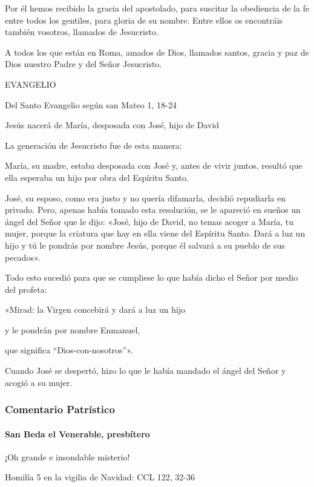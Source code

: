 \documentclass[]{article}
\let\oldparagraph\paragraph
\renewcommand{\paragraph}[1]{\oldparagraph{#1}\mbox{}}
\begin{document}
Por él hemos recibido la gracia del apostolado, para suscitar la
obediencia de la fe entre todos los gentiles, para gloria de su nombre.
Entre ellos os encontráis también vosotros, llamados de Jesucristo.

A todos los que están en Roma, amados de Dios, llamados santos, gracia y
paz de Dios nuestro Padre y del Señor Jesucristo.

EVANGELIO

Del Santo Evangelio según san Mateo 1, 18-24

Jesús nacerá de María, desposada con José, hijo de David

La generación de Jesucristo fue de esta manera:

María, su madre, estaba desposada con José y, antes de vivir juntos,
resultó que ella esperaba un hijo por obra del Espíritu Santo.

José, su esposo, como era justo y no quería difamarla, decidió
repudiarla en privado. Pero, apenas había tomado esta resolución, se le
apareció en sueños un ángel del Señor que le dijo: «José, hijo de David,
no temas acoger a María, tu mujer, porque la criatura que hay en ella
viene del Espíritu Santo. Dará a luz un hijo y tú le pondrás por nombre
Jesús, porque él salvará a su pueblo de sus pecados».

Todo esto sucedió para que se cumpliese lo que había dicho el Señor por
medio del profeta:

«Mirad: la Virgen concebirá y dará a luz un hijo

y le pondrán por nombre Enmanuel,

que significa ``Dios-con-nosotros''».

Cuando José se despertó, hizo lo que le había mandado el ángel del Señor
y acogió a su mujer.



\subsubsection{Comentario Patrístico}\label{comentario-patruxedstico-3}

\paragraph{San Beda el Venerable,
presbítero}\label{san-beda-el-venerable-presbuxedtero}

¡Oh grande e insondable misterio!

Homilía 5 en la vigilia de Navidad: CCL 122, 32-36
\end{document}
